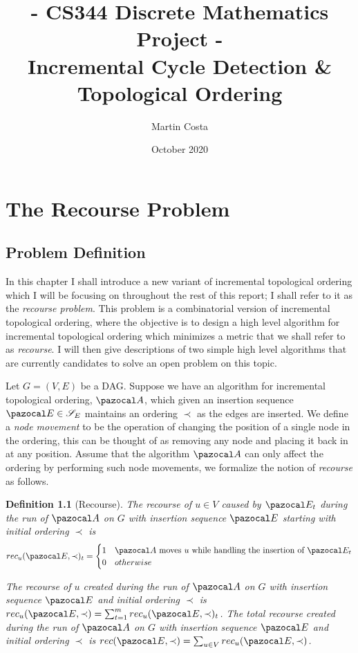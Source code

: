 \documentclass{report}
\title{- CS344 Discrete Mathematics Project - \\  Incremental Cycle Detection \& Topological Ordering}
\author{Martin Costa}
\date{October 2020}
\newtheorem{definition}[theorem]{Definition}
\begin{document}
\chapter{The Recourse Problem}

\section{Problem Definition}

In this chapter I shall introduce a new variant of incremental topological ordering which I will be focusing on throughout the rest of this report; I shall refer to it as the \textit{recourse problem}. This problem is a combinatorial version of incremental topological ordering, where the objective is to design a high level algorithm for incremental topological ordering which minimizes a metric that we shall refer to as \textit{recourse}. I will then give descriptions of two simple high level algorithms that are currently candidates to solve an open problem on this topic.

Let $G=(V,E)$ be a DAG. Suppose we have an algorithm for incremental topological ordering, $\pazocal A$, which given an insertion sequence $\pazocal E \in \mathcal S_E$ maintains an ordering $\prec$ as the edges are inserted. We define a \textit{node movement} to be the operation of changing the position of a single node in the ordering, this can be thought of as removing any node and placing it back in at any position. Assume that the algorithm $\pazocal A$ can only affect the ordering by performing such node movements, we formalize the notion of \textit{recourse} as follows.

\begin{definition}[Recourse]
The \textit{recourse} of $u \in V$ caused by $\pazocal E_t$ during the run of $\pazocal A$ on $G$ with insertion sequence $\pazocal E$ starting with initial ordering $\prec$ is
\[ rec_u(\pazocal E, \prec)_t = \begin{cases} 
      1 & \textnormal{$\pazocal A$ moves $u$ while handling the insertion of $\pazocal E_t$}\\
      0 & otherwise \\
   \end{cases}
\]

The \textit{recourse} of $u$ created during the run of $\pazocal A$ on $G$ with insertion sequence $\pazocal E$ and initial ordering $\prec$ is $rec_u(\pazocal E, \prec) = \sum_{t=1}^m  rec_u(\pazocal E, \prec)_t$. The \textit{total recourse} created during the run of $\pazocal A$ on $G$ with insertion sequence $\pazocal E$ and initial ordering $\prec$ is $rec(\pazocal E, \prec) = \sum_{u \in V} rec_u(\pazocal E, \prec)$.
\end{definition}
\end{document}
